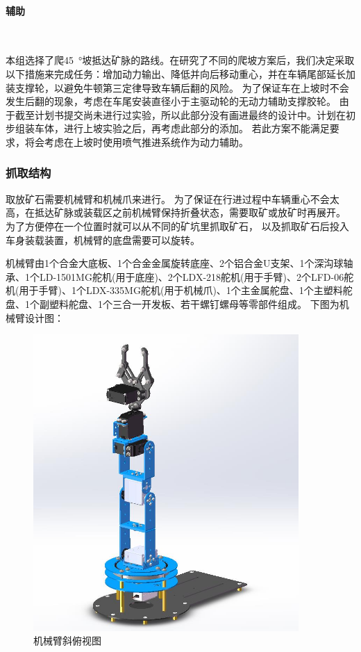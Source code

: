 \documentclass[10pt]{ctexart}
\newcommand{\subsubsubsection}[1]{\paragraph{#1}\mbox{}\\}
\begin{document}
\subsubsubsection{辅助}
\par
本组选择了爬\SI{45}{\degree}坡抵达矿脉的路线。在研究了不同的爬坡方案后，我们决定采取以下措施来完成任务：增加动力输出、降低并向后移动重心，并在车辆尾部延长加装支撑轮，以避免牛顿第三定律导致车辆后翻的风险。
为了保证车在上坡时不会发生后翻的现象，考虑在车尾安装直径小于主驱动轮的无动力辅助支撑胶轮。
由于截至计划书提交尚未进行过实验，所以此部分没有画进最终的设计中。计划在初步组装车体，进行上坡实验之后，再考虑此部分的添加。
若此方案不能满足要求，将会考虑在上坡时使用喷气推进系统作为动力辅助。
\subsubsection{抓取结构}
\par
取放矿石需要机械臂和机械爪来进行。
为了保证在行进过程中车辆重心不会太高，在抵达矿脉或装载区之前机械臂保持折叠状态，需要取矿或放矿时再展开。
为了方便停在一个位置时就可以从不同的矿坑里抓取矿石，
以及抓取矿石后投入车身装载装置，机械臂的底盘需要可以旋转。
\par
机械臂由1个合金大底板、1个合金金属旋转底座、2个铝合金U支架、1个深沟球轴承、1个LD-1501MG舵机(用于底座)、2个LDX-218舵机(用于手臂)、2个LFD-06舵机(用于手臂)、1个LDX-335MG舵机(用于机械爪)、1个主金属舵盘、1个主塑料舵盘、1个副塑料舵盘、1个三合一开发板、若干螺钉螺母等零部件组成。
下图为机械臂设计图：
\begin{figure}[H]
    \centering
    \includegraphics[width = 0.9\textwidth]{machinery/arm.jpg}
    \caption{机械臂斜俯视图}
    \label{fig:arm}
\end{figure}
\end{document}
